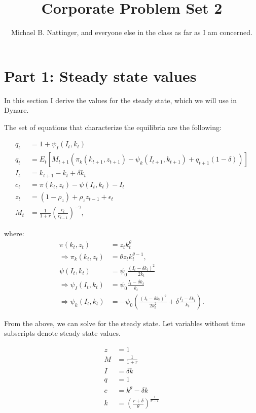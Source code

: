 \documentclass[11pt]{article} %
\title{Corporate Problem Set 2}
\author{Michael B. Nattinger, and everyone else in the class as far as I am concerned.}
\begin{document}
\maketitle
\section{Part 1: Steady state values}
In this section I derive the values for the steady state, which we will use in Dynare.

The set of equations that characterize the equilibria are the following:

\begin{align}
q_t &= 1 + \psi_I(I_t,k_t) \\
q_t &= E_t[M_{t+1}(\pi_k(k_{t+1},z_{t+1}) - \psi_k(I_{t+1},k_{t+1}) + q_{t+1}(1-\delta))]\\
I_t &= k_{t+1} - k_t + \delta k_t \\
c_t &= \pi(k_t,z_t) - \psi(I_t,k_t) - I_t \\
z_t &= (1-\rho_z) + \rho_z z_{t-1} + \epsilon_t \\
M_t &= \frac{1}{1+r}\left(\frac{c_t}{c_{t-1}}\right)^{-\gamma},
\end{align}

where:
\begin{align*}
\pi(k_t,z_t) &= z_t k_t^{\theta} \\
\Rightarrow \pi_k(k_t,z_t) &= \theta z_t k_t^{\theta - 1}, \\
\psi(I_t,k_t) &= \psi_0 \frac{(I_t - \delta k_t)^2}{2k_t} \\
\Rightarrow \psi_I(I_t,k_t) &=  \psi_0 \frac{I_t - \delta k_t}{k_t} \\
\Rightarrow \psi_k(I_t,k_t) &=  -\psi_0\left( \frac{(I_t - \delta k_t)^2}{2k_t^2}   + \delta \frac{I_t - \delta k_t}{k_t}\right).
\end{align*}

From the above, we can solve for the steady state. Let variables without time subscripts denote steady state values.

\begin{align*}
z &= 1\\
M &= \frac{1}{1+r} \\
I &= \delta k  \\
q &= 1 \\
c &= k^{\theta} - \delta k \\
k &= \left(\frac{r+\delta}{\theta}\right)^{\frac{1}{\theta - 1}} 
\end{align*}
\end{document}
